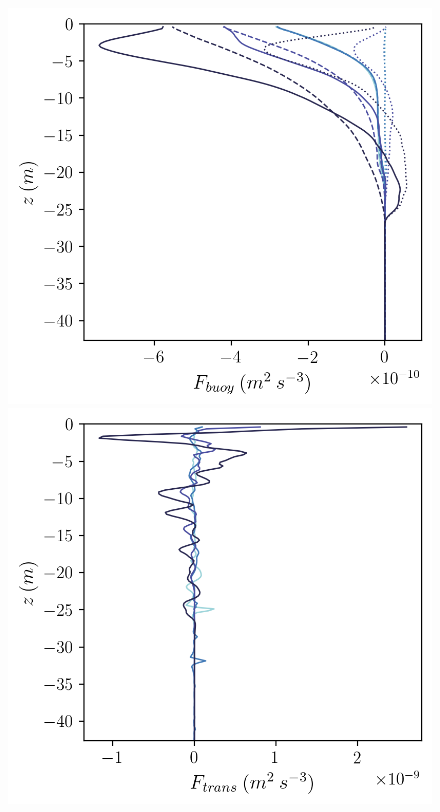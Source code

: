 \documentclass[draft]{agujournal2019}
\begin{document}
\begin{figure}
\begin{minipage}{0.5\textwidth}
    \end{minipage}
    \newline
    \begin{minipage}{0.5\textwidth}
        \includegraphics[trim={0 0 0 0},clip,width=\textwidth]{Figures/Fbuoy_cmp_dslope_43h_tav13h_z_profile.png}
    \end{minipage}%
    \begin{minipage}{0.5\textwidth}
        \includegraphics[trim={0 0 0 0},clip,width=\textwidth]{Figures/Ftrans_cmp_dslope_43h_tav13h_z_profile.png}

\end{minipage}
\end{figure}
\end{document}
